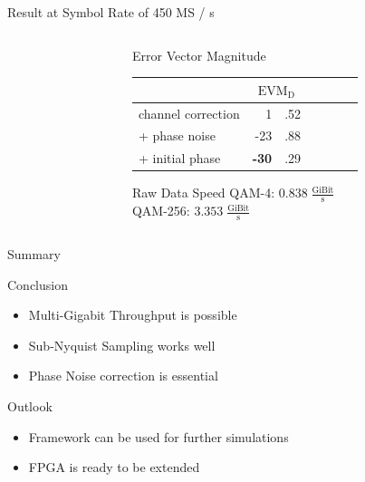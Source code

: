 \documentclass{beamer}
\newcommand{\mc}[2]{\multicolumn{#1}{c|}{#2}}
\begin{document}
\begin{frame}{Result at Symbol Rate of 450 MS / s}
\begin{columns}[T]
\begin{column}{.4\textwidth}
    \end{column}
    \begin{column}{.6\textwidth}
      \begin{block}{Error Vector Magnitude}
        \begin{tabular}{|l|r@{}l|r@{}l|r@{}l|}
          \hline
          & \mc{2}{$\text{EVM}_\text{D}$} \\ \hline
          channel correction &   1&.52 \\ \hline
          + phase noise      & -23&.88 \\ \hline
          + initial phase    & {\bf-30}&.29 \\ \hline
        \end{tabular}
      \end{block}
      \begin{block}{Raw Data Speed}
        QAM-4: $0.838 \;\frac{\text{GiBit}}{\text{s}}$ \\
        QAM-256: $3.353 \;\frac{\text{GiBit}}{\text{s}}$
      \end{block}
    \end{column}
  \end{columns}
\end{frame}



\begin{frame}{Summary}
\end{frame}

\begin{frame}{Conclusion}
  \begin{itemize}
  \item Multi-Gigabit Throughput is possible
  \item Sub-Nyquist Sampling works well
  \item Phase Noise correction is essential
  \end{itemize}
\end{frame}

\begin{frame}{Outlook}
  \begin{itemize}
  \item Framework can be used for further simulations
  \item FPGA is ready to be extended
  \end{itemize}
\end{frame}
\end{document}
